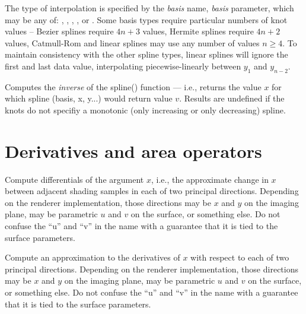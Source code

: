 \documentclass[11pt,letterpaper]{book}
\begin{document}
The type of interpolation is specified by the \emph{basis} name,
\emph{basis} parameter, which may be any of: ,
, , , or .  Some basis
types require particular numbers of knot values -- Bezier splines
require $4n+3$ values, Hermite splines require $4n+2$ values,
Catmull-Rom and linear splines may use any number of values $n\ge 4$.
To maintain consistency with the other spline types, linear splines will
ignore the first and last data value, interpolating piecewise-linearly
between $y_1$ and $y_{n-2}$.
\apiend


Computes the \emph{inverse} of the {\cf spline()} function --- i.e., returns
the value $x$ for which {\cf spline (basis, x, y...)} would return value
$v$.  Results are undefined if the knots do not specifiy a monotonic
(only increasing or only decreasing) spline.
\apiend



\section{Derivatives and area operators}
\label{sec:stdlib:derivs}

 
Compute differentials of the argument $x$, i.e., the approximate change
in $x$ between adjacent shading samples in each of two principal
directions.  Depending on the renderer implementation, those directions
may be $x$ and $y$ on the imaging plane, may be parametric $u$ and $v$
on the surface, or something else.  Do not confuse the ``u'' and ``v''
in the name with a guarantee that it is tied to the surface parameters.
\apiend

 
Compute an approximation to the derivatives of $x$ with respect to
each of two principal directions.  Depending on the renderer
implementation, those directions may be $x$ and $y$ on the imaging
plane, may be parametric $u$ and $v$ on the surface, or something else.
Do not confuse the ``u'' and ``v'' in the name with a guarantee that it
is tied to the surface parameters.
\apiend
\end{document}
